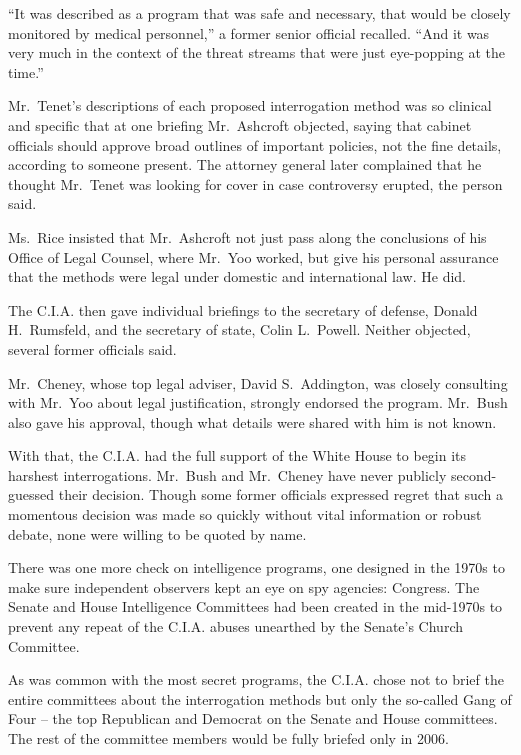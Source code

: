 \documentclass[12pt,a4paper,onecolumn]{article}
\begin{document}
``It was described as a program that was safe and necessary, that would be closely monitored by
medical personnel,'' a former senior official recalled. ``And it was very much in the context of the
threat streams that were just eye-popping at the time.''

Mr.~Tenet's descriptions of each proposed interrogation method was so clinical and specific that at
one briefing Mr.~Ashcroft objected, saying that cabinet officials should approve broad outlines of
important policies, not the fine details, according to someone present. The attorney general later
complained that he thought Mr.~Tenet was looking for cover in case controversy erupted, the person
said.

Ms.~Rice insisted that Mr.~Ashcroft not just pass along the conclusions of his Office of Legal
Counsel, where Mr.~Yoo worked, but give his personal assurance that the methods were legal under
domestic and international law. He did.

The C.I.A. then gave individual briefings to the secretary of defense, Donald H.~Rumsfeld, and the
secretary of state, Colin L.~Powell. Neither objected, several former officials said.

Mr.~Cheney, whose top legal adviser, David S.~Addington, was closely consulting with Mr.~Yoo about
legal justification, strongly endorsed the program. Mr.~Bush also gave his approval, though what
details were shared with him is not known.

With that, the C.I.A. had the full support of the White House to begin its harshest interrogations.
Mr.~Bush and Mr.~Cheney have never publicly second-guessed their decision. Though some former
officials expressed regret that such a momentous decision was made so quickly without vital
information or robust debate, none were willing to be quoted by name.

There was one more check on intelligence programs, one designed in the 1970s to make sure
independent observers kept an eye on spy agencies: Congress. The Senate and House Intelligence
Committees had been created in the mid-1970s to prevent any repeat of the C.I.A. abuses unearthed by
the Senate's Church Committee.

As was common with the most secret programs, the C.I.A. chose not to brief the entire committees
about the interrogation methods but only the so-called Gang of Four -- the top Republican and
Democrat on the Senate and House committees. The rest of the committee members would be fully
briefed only in 2006.
\end{document}
